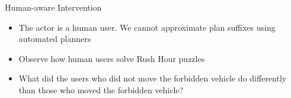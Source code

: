 \begin{frame}{Human-aware Intervention}
\begin{itemize}
\item The actor is a human user. We cannot approximate plan suffixes using automated planners
\item Observe how human users solve Rush Hour puzzles
\item What did the users who did not move the forbidden vehicle do
differently than those who moved the forbidden vehicle?
\end{itemize}

\end{frame}